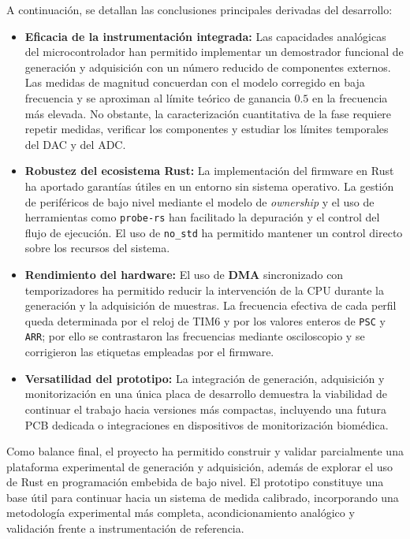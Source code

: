 \documentclass[11pt,a4paper]{article}
\begin{document}
A continuación, se detallan las conclusiones principales derivadas del desarrollo:

\begin{itemize}
    \item \textbf{Eficacia de la instrumentación integrada:} Las capacidades analógicas del microcontrolador han permitido implementar un demostrador funcional de generación y adquisición con un número reducido de componentes externos. Las medidas de magnitud concuerdan con el modelo corregido en baja frecuencia y se aproximan al límite teórico de ganancia \(0.5\) en la frecuencia más elevada. No obstante, la caracterización cuantitativa de la fase requiere repetir medidas, verificar los componentes y estudiar los límites temporales del DAC y del ADC.
    
    \item \textbf{Robustez del ecosistema Rust:} La implementación del firmware en Rust ha aportado garantías útiles en un entorno sin sistema operativo. La gestión de periféricos de bajo nivel mediante el modelo de \textit{ownership} y el uso de herramientas como \texttt{probe-rs} han facilitado la depuración y el control del flujo de ejecución. El uso de \texttt{no\_std} ha permitido mantener un control directo sobre los recursos del sistema.

    \item \textbf{Rendimiento del hardware:} El uso de \textbf{DMA} sincronizado con temporizadores ha permitido reducir la intervención de la CPU durante la generación y la adquisición de muestras. La frecuencia efectiva de cada perfil queda determinada por el reloj de TIM6 y por los valores enteros de \texttt{PSC} y \texttt{ARR}; por ello se contrastaron las frecuencias mediante osciloscopio y se corrigieron las etiquetas empleadas por el firmware.

    \item \textbf{Versatilidad del prototipo:} La integración de generación, adquisición y monitorización en una única placa de desarrollo demuestra la viabilidad de continuar el trabajo hacia versiones más compactas, incluyendo una futura PCB dedicada o integraciones en dispositivos de monitorización biomédica.
\end{itemize}

Como balance final, el proyecto ha permitido construir y validar parcialmente una plataforma experimental de generación y adquisición, además de explorar el uso de Rust en programación embebida de bajo nivel. El prototipo constituye una base útil para continuar hacia un sistema de medida calibrado, incorporando una metodología experimental más completa, acondicionamiento analógico y validación frente a instrumentación de referencia.
\end{document}
